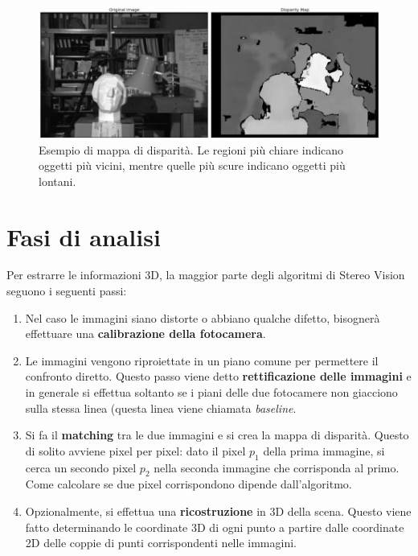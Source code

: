 \documentclass[12pt,a4paper,openright,twoside]{report}
\begin{document}
\begin{figure}[h]
    \centering
    \includegraphics[width=\textwidth]{disparity_map.jpg}
    \caption[Esempio di mappa di disparità.]{Esempio di mappa di disparità. Le regioni più chiare indicano oggetti più vicini, mentre quelle più scure indicano oggetti più lontani.}
    \label{img:disparity_map}
\end{figure}

\section{Fasi di analisi}

Per estrarre le informazioni 3D, la maggior parte degli algoritmi di Stereo Vision seguono i seguenti passi:

\begin{enumerate}
    \item Nel caso le immagini siano distorte o abbiano qualche difetto, bisognerà effettuare una \textbf{calibrazione della fotocamera}.
    \item Le immagini vengono riproiettate in un piano comune per permettere il confronto diretto. Questo passo viene detto \textbf{rettificazione delle immagini} e in generale si effettua soltanto se i piani delle due fotocamere non giacciono sulla stessa linea (questa linea viene chiamata \textit{baseline}.
    \item Si fa il \textbf{matching} tra le due immagini e si crea la mappa di disparità. Questo di solito avviene pixel per pixel: dato il pixel $p_{1}$ della prima immagine, si cerca un secondo pixel $p_{2}$ nella seconda immagine che corrisponda al primo. Come calcolare se due pixel corrispondono dipende dall'algoritmo.
    \item Opzionalmente, si effettua una \textbf{ricostruzione} in 3D della scena. Questo viene fatto determinando le coordinate 3D di ogni punto a partire dalle coordinate 2D delle coppie di punti corrispondenti nelle immagini.
\end{enumerate}
\end{document}
